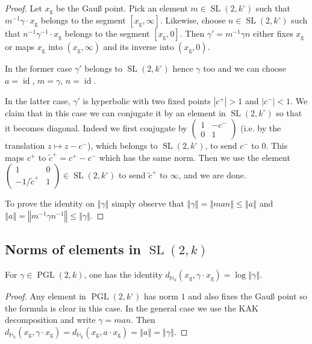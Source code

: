 \documentclass[AHL,Unicode,longabstracts]{cedram}
\DeclareMathOperator{\id}{id}
\DeclareMathOperator{\SL}{SL}
\DeclareMathOperator{\PGL}{PGL}
\newcommand{\hh}{\mathbb{H}}
\newcommand{\norm}[1]{\left\Vert#1\right\Vert}
\newcommand{\lrpar}[1]{\left(#1\right)}
\newcommand{\SLk}{\SL(2,k)}
\newcommand{\PGLk}{\PGL(2, k)}
\begin{document}
\begin{proof}
Let $x_{\mathrm{g}}$ be the Gau{\ss} point. Pick an element $m\in \SL(2,k^\circ)$ such that $m^{-1} \gamma\cdot x_{\mathrm{g}}$ belongs to the segment $[x_{\mathrm{g}}, \infty]$. Likewise, choose $n\in \SL(2,k^\circ)$ such that $n^{-1} \gamma^{-1} \cdot x_{\mathrm{g}}$ belongs to the segment $[x_{\mathrm{g}}, 0]$. Then $\gamma' = m^{-1} \gamma n$ either fixes $x_{\mathrm{g}}$ or maps $x_{\mathrm{g}}$ into $(x_{\mathrm{g}}, \infty)$ and its inverse into $(x_{\mathrm{g}},0)$.

In the former case $\gamma'$ belongs to $\SL(2,k^\circ)$ hence $\gamma$ too and we can choose $a = \id$, $m = \gamma$, $n=\id$.

In the latter case, $\gamma'$ is hyperbolic with two fixed points $|c^+| >1$ and $|c^-|<1$. We claim that in this case we can conjugate it by an element in $\SL(2,k^\circ)$ so that it becomes diagonal. Indeed we first conjugate by $\lrpar{
\begin{smallmatrix}
1 & -c^- \\ 0 & 1
\end{smallmatrix}}$ (i.e. by the translation $z\mapsto z-c^-$), which belongs to $\SL(2,k^\circ)$, to send $c^-$ to 0. This maps $c^+$ to $ \tilde c^+ = c^+ - c^-$ which has the same norm. Then we use the element $\lrpar{
\begin{smallmatrix}
1 & 0\\ -1/\tilde c^+ & 1
\end{smallmatrix}}\in \SL(2,k^\circ)$ to send $ \tilde c^+$ to $\infty$, and we are done.

To prove the identity on $\norm{\gamma}$ simply observe that $\norm{\gamma} = \norm{man} \le \norm{a}$ and $ \norm{a} = \norm{m^{-1} \gamma n^{-1}} \le \norm{\gamma}$.
\end{proof}

\subsection{Norms of elements in \texorpdfstring{$\SLk$}{SLk}}

\begin{lemm}
For $\gamma\in \PGLk$, one has the identity $d_{\hh_k}(x_{\mathrm{g}}, \gamma\cdot x_{\mathrm{g}}) = \log \norm{\gamma}$.
\end{lemm}

\begin{proof}
Any element in $\PGL(2,k^\circ)$ has norm $1$ and also fixes the Gau{\ss} point so the formula is clear in this case. In the general case we use the KAK decomposition and write $\gamma = man$. Then $d_{\hh_k}(x_{\mathrm{g}}, \gamma\cdot x_{\mathrm{g}}) = d_{\hh_k}(x_{\mathrm{g}}, a \cdot x_{\mathrm{g}}) = \norm{a}=\norm{\gamma}$.
\end{proof}
\end{document}
